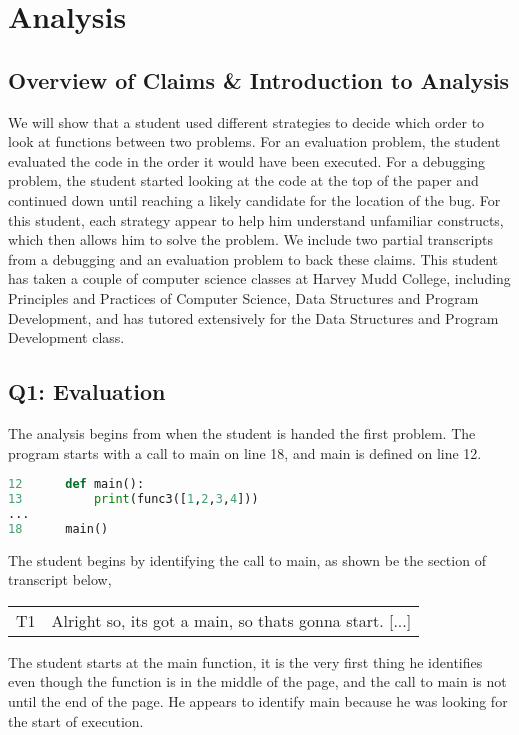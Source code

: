 \section{Analysis}
\subsection{Overview of Claims \& Introduction to Analysis}

We will show that a student used different strategies to decide which order to look at functions between two problems.
For an evaluation problem, the student evaluated the code in the order it would have been executed.
For a debugging problem, the student started looking at the code at the top of the paper and continued down until reaching a likely candidate for the location of the bug.
For this student, each strategy appear to help him understand unfamiliar constructs, which then allows him to solve the problem. 
We include two partial transcripts from a debugging and an evaluation problem to back these claims. 
This student has taken a couple of computer science classes at Harvey Mudd College, including Principles and Practices of Computer Science, Data Structures and Program Development, and has tutored extensively for the Data Structures and Program Development class.

\subsection{Q1: Evaluation}

The analysis begins from when the student is handed the first problem.
The program starts with a call to main on line 18, and main is defined on line 12.

\begin{lstlisting}[language=python]
12		def main():
13			print(func3([1,2,3,4]))
...
18		main()
\end{lstlisting}

The student begins by identifying the call to main, as shown be the section of transcript below,

\begin{tabular}{lp{13cm}}
T1&Alright so, its got a main, so thats gonna start. [...]\\
\end{tabular}

The student starts at the main function, it is the very first thing he identifies even though the function is in the middle of the page, and the call to main is not until the end of the page.
He appears to identify main because he was looking for the start of execution. \\


